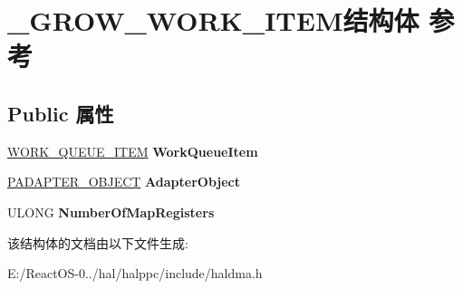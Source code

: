 \hypertarget{struct___g_r_o_w___w_o_r_k___i_t_e_m}{}\section{\+\_\+\+G\+R\+O\+W\+\_\+\+W\+O\+R\+K\+\_\+\+I\+T\+E\+M结构体 参考}
\label{struct___g_r_o_w___w_o_r_k___i_t_e_m}
\subsection*{Public 属性}
\begin{DoxyCompactItemize}
\item 
\mbox{\label{struct___g_r_o_w___w_o_r_k___i_t_e_m_a1bc6bb9be9daf6ccbec3a47afce90dd9}} 
\hyperlink{struct___w_o_r_k___q_u_e_u_e___i_t_e_m}{W\+O\+R\+K\+\_\+\+Q\+U\+E\+U\+E\+\_\+\+I\+T\+EM} {\bfseries Work\+Queue\+Item}
\item 
\mbox{\label{struct___g_r_o_w___w_o_r_k___i_t_e_m_a951a01ff70a559ef164ddcefdd058424}} 
\hyperlink{struct___d_m_a___a_d_a_p_t_e_r}{P\+A\+D\+A\+P\+T\+E\+R\+\_\+\+O\+B\+J\+E\+CT} {\bfseries Adapter\+Object}
\item 
\mbox{\label{struct___g_r_o_w___w_o_r_k___i_t_e_m_ad2c5a24f151daf6e421bf5a8e42b2497}} 
U\+L\+O\+NG {\bfseries Number\+Of\+Map\+Registers}
\end{DoxyCompactItemize}


该结构体的文档由以下文件生成\+:\begin{DoxyCompactItemize}
\item 
E\+:/\+React\+O\+S-\/0../hal/halppc/include/haldma.\+h\end{DoxyCompactItemize}
